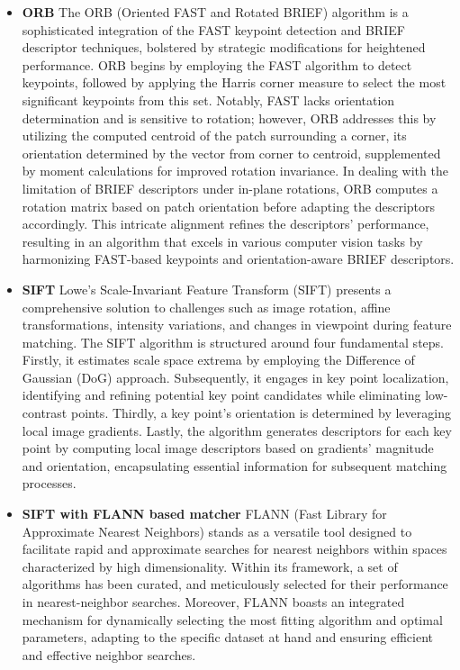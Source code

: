 \begin{itemize}
  \item \textbf{ORB}\newline
  The ORB (Oriented FAST and Rotated BRIEF) algorithm is a sophisticated integration of the FAST keypoint detection and BRIEF descriptor techniques, bolstered by strategic modifications for heightened performance. ORB begins by employing the FAST algorithm to detect keypoints, followed by applying the Harris corner measure to select the most significant keypoints from this set. Notably, FAST lacks orientation determination and is sensitive to rotation; however, ORB addresses this by utilizing the computed centroid of the patch surrounding a corner, its orientation determined by the vector from corner to centroid, supplemented by moment calculations for improved rotation invariance. In dealing with the limitation of BRIEF descriptors under in-plane rotations, ORB computes a rotation matrix based on patch orientation before adapting the descriptors accordingly. This intricate alignment refines the descriptors' performance, resulting in an algorithm that excels in various computer vision tasks by harmonizing FAST-based keypoints and orientation-aware BRIEF descriptors.
  \item \textbf{SIFT}\newline
  Lowe's Scale-Invariant Feature Transform (SIFT) presents a comprehensive solution to challenges such as image rotation, affine transformations, intensity variations, and changes in viewpoint during feature matching. The SIFT algorithm is structured around four fundamental steps. Firstly, it estimates scale space extrema by employing the Difference of Gaussian (DoG) approach. Subsequently, it engages in key point localization, identifying and refining potential key point candidates while eliminating low-contrast points. Thirdly, a key point's orientation is determined by leveraging local image gradients. Lastly, the algorithm generates descriptors for each key point by computing local image descriptors based on gradients' magnitude and orientation, encapsulating essential information for subsequent matching processes.
  \item \textbf{SIFT with FLANN based matcher}\newline
  FLANN (Fast Library for Approximate Nearest Neighbors) stands as a versatile tool designed to facilitate rapid and approximate searches for nearest neighbors within spaces characterized by high dimensionality. Within its framework, a set of algorithms has been curated, and meticulously selected for their performance in nearest-neighbor searches. Moreover, FLANN boasts an integrated mechanism for dynamically selecting the most fitting algorithm and optimal parameters, adapting to the specific dataset at hand and ensuring efficient and effective neighbor searches.
\end{itemize}

